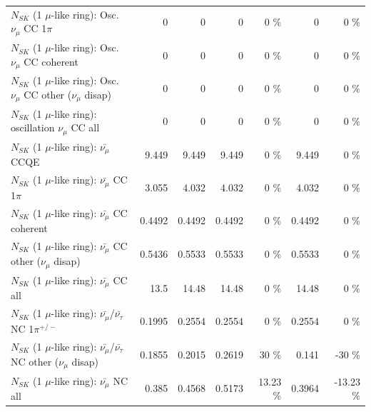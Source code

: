 \begin{table}
\begin{tabular}{| l | r | r | r  r | r  r |}
                          $N_{SK}$ (1 $\mu$-like ring): Osc. $\nu_\mu$ CC 1$\pi$ &               0 &               0 &               0 &        0 \%  &               0 &        0 \%  \\ 
                        $N_{SK}$ (1 $\mu$-like ring): Osc. $\nu_\mu$ CC coherent &               0 &               0 &               0 &        0 \%  &               0 &        0 \%  \\ 
         $N_{SK}$ (1 $\mu$-like ring): Osc. $\nu_\mu$ CC other ($\nu_\mu$ disap) &               0 &               0 &               0 &        0 \%  &               0 &        0 \%  \\ 
                      $N_{SK}$ (1 $\mu$-like ring): oscillation $\nu_\mu$ CC all &               0 &               0 &               0 &        0 \%  &               0 &        0 \%  \\ 
\hline
\hline
                              $N_{SK}$ (1 $\mu$-like ring): $\bar{\nu_\mu}$ CCQE &           9.449 &           9.449 &           9.449 &        0 \%  &           9.449 &        0 \%  \\ 
                         $N_{SK}$ (1 $\mu$-like ring): $\bar{\nu_\mu}$ CC 1$\pi$ &           3.055 &           4.032 &           4.032 &        0 \%  &           4.032 &        0 \%  \\ 
                       $N_{SK}$ (1 $\mu$-like ring): $\bar{\nu_\mu}$ CC coherent &          0.4492 &          0.4492 &          0.4492 &        0 \%  &          0.4492 &        0 \%  \\ 
        $N_{SK}$ (1 $\mu$-like ring): $\bar{\nu_\mu}$ CC other ($\nu_\mu$ disap) &          0.5436 &          0.5533 &          0.5533 &        0 \%  &          0.5533 &        0 \%  \\ 
                          $N_{SK}$ (1 $\mu$-like ring): $\bar{\nu_{\mu}}$ CC all &            13.5 &           14.48 &           14.48 &        0 \%  &           14.48 &        0 \%  \\ 
\hline
  $N_{SK}$ (1 $\mu$-like ring): $\bar{\nu_\mu}$/$\bar{\nu_\tau}$ NC 1$\pi^{+/-}$ &          0.1995 &          0.2554 &          0.2554 &        0 \%  &          0.2554 &        0 \%  \\ 
$N_{SK}$ (1 $\mu$-like ring): $\bar{\nu_\mu}$/$\bar{\nu_\tau}$ NC other ($\nu_\mu$ disap) &          0.1855 &          0.2015 &          0.2619 &       30 \%  &           0.141 &      -30 \%  \\ 
                          $N_{SK}$ (1 $\mu$-like ring): $\bar{\nu_{\mu}}$ NC all &           0.385 &          0.4568 &          0.5173 &    13.23 \%  &          0.3964 &   -13.23 \%  \\ 

\end{tabular}
\end{table}
